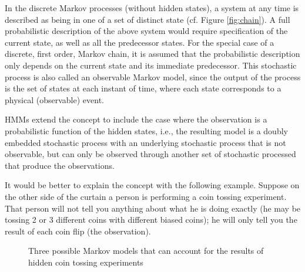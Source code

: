 \documentclass[paper=a4, fontsize=18pt]{article} %
\numberwithin{equation}{section} %
\numberwithin{figure}{section} %
\numberwithin{table}{section} %
\begin{document}
In the discrete Markov processes (without hidden states), a system at any time is described as being in one of a set of distinct state (cf. Figure \ref{fig:chain}). A full probabilistic description of the above system would require specification of the current state, as well as all the predecessor states. For the special case of a discrete, first order, Markov chain, it is assumed that the probabilistic description only depends on the current state and its immediate predecessor. This stochastic process is also called an observable Markov model, since the output of the process is the set of states at each instant of time, where each state corresponds to a physical (observable) event.

HMMs extend the concept to include the case where the observation is a probabilistic function of the hidden states, i.e., the resulting model is a doubly embedded stochastic process with an underlying stochastic process that is not observable, but can only be observed through another set of stochastic processed that produce the observations.

It would be better to explain the concept with the following example. Suppose on the other side of the curtain a person is performing a coin tossing experiment. That person will not tell you anything about what he is doing exactly (he may be tossing 2 or 3 different coins with different biased coins); he will only tell you the result of each coin flip (the observation).

\begin{figure}[htbp]
  \centering
  \caption{Three possible Markov models that can account for the results of hidden coin tossing experiments}\label{fig:coin}
\end{figure}
\end{document}
